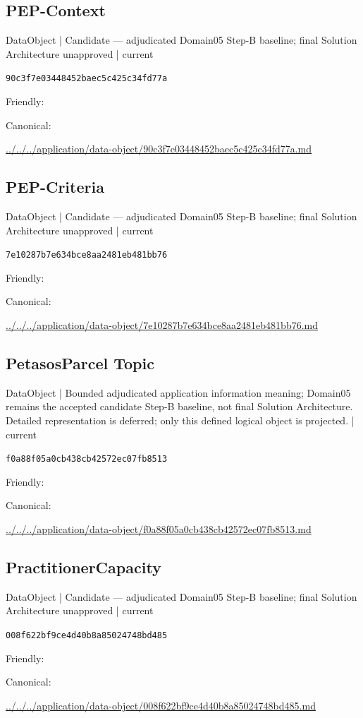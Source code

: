 \documentclass[10pt,a4paper]{article}
\begin{document}
\subsection*{PEP-Context}
{\small DataObject | Candidate — adjudicated Domain05 Step-B baseline; final Solution Architecture unapproved | current}\par
\texttt{90c3f7e03448452baec5c425c34fd77a}\par
Friendly: \par
Canonical: \par
{\footnotesize\url{../../../application/data-object/90c3f7e03448452baec5c425c34fd77a.md}}\par
\subsection*{PEP-Criteria}
{\small DataObject | Candidate — adjudicated Domain05 Step-B baseline; final Solution Architecture unapproved | current}\par
\texttt{7e10287b7e634bce8aa2481eb481bb76}\par
Friendly: \par
Canonical: \par
{\footnotesize\url{../../../application/data-object/7e10287b7e634bce8aa2481eb481bb76.md}}\par
\subsection*{PetasosParcel Topic}
{\small DataObject | Bounded adjudicated application information meaning; Domain05 remains the accepted candidate Step-B baseline, not final Solution Architecture. Detailed representation is deferred; only this defined logical object is projected. | current}\par
\texttt{f0a88f05a0cb438cb42572ec07fb8513}\par
Friendly: \par
Canonical: \par
{\footnotesize\url{../../../application/data-object/f0a88f05a0cb438cb42572ec07fb8513.md}}\par
\subsection*{PractitionerCapacity}
{\small DataObject | Candidate — adjudicated Domain05 Step-B baseline; final Solution Architecture unapproved | current}\par
\texttt{008f622bf9ce4d40b8a85024748bd485}\par
Friendly: \par
Canonical: \par
{\footnotesize\url{../../../application/data-object/008f622bf9ce4d40b8a85024748bd485.md}}\par
\end{document}
